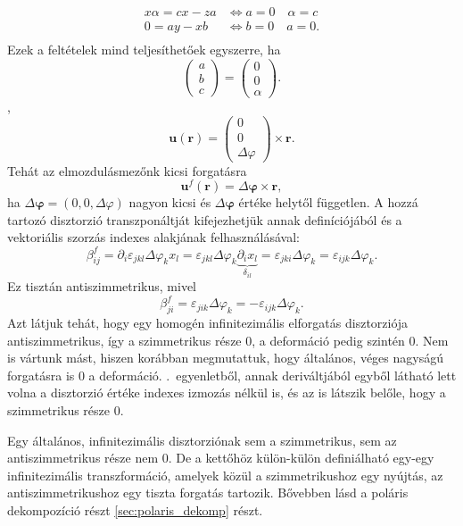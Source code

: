\documentclass[12pt,a4paper]{scrartcl}
\let\mathbf\bm
\begin{document}
{\[\begin{aligned}
  x\alpha  = cx - za &  \Leftrightarrow a = 0\quad \alpha  = c \\ 
  0 = ay - xb &  \Leftrightarrow b = 0\quad a = 0. \\ 
\end{aligned} \]
Ezek a feltételek mind teljesíthetőek egyszerre, ha 
\[\left( {\begin{array}{*{20}{c}}
  a \\ 
  b \\ 
  c 
\end{array}} \right) = \left( {\begin{array}{*{20}{c}}
  0 \\ 
  0 \\ 
  \alpha  
\end{array}} \right).\]},
\[{\mathbf{u}}\left( {\mathbf{r}} \right) = \left( {\begin{array}{*{20}{c}}
  0 \\ 
  0 \\ 
  \Delta \varphi  
\end{array}} \right) \times {\mathbf{r}}.\]
Tehát az elmozdulásmezőnk kicsi forgatásra
\begin{equation} \label{eq:inf_forgat}
{{\mathbf{u}}^f}\left( {\mathbf{r}} \right) = \Delta {\mathbf{\varphi }} \times {\mathbf{r}},
\end{equation}
ha $\Delta {\mathbf{\varphi }} = \left( {0,0,\Delta \varphi } \right)$ nagyon kicsi és $\Delta {\mathbf{\varphi }}$ értéke helytől független. A hozzá tartozó disztorzió transzponáltját kifejezhetjük annak definíciójából és a vektoriális szorzás indexes alakjának felhasználásával:
\[\beta _{ij}^f = {\partial _i}{\varepsilon _{jkl}}\Delta {\varphi _k}{x_l} = {\varepsilon _{jkl}}\Delta {\varphi _k}\underbrace {{\partial _i}{x_l}}_{{\delta _{il}}} = {\varepsilon _{jki}}\Delta {\varphi _k} = {\varepsilon _{ijk}}\Delta {\varphi _k}.\]
Ez tisztán antiszimmetrikus, mivel
\[\beta _{ji}^f = {\varepsilon _{jik}}\Delta {\varphi _k} =  - {\varepsilon _{ijk}}\Delta {\varphi _k}.\]
Azt látjuk tehát, hogy egy homogén infinitezimális elforgatás disztorziója  antiszimmetrikus, így a szimmetrikus része 0, a deformáció pedig szintén 0. Nem is vártunk mást, hiszen korábban megmutattuk, hogy általános, véges nagyságú forgatásra is 0 a deformáció. .\ egyenletből, annak deriváltjából egyből látható lett volna a disztorzió értéke indexes izmozás nélkül is, és az is látszik belőle, hogy a szimmetrikus része 0.

Egy általános, infinitezimális disztorziónak sem a szimmetrikus, sem az antiszimmetrikus része nem 0. De a kettőhöz külön-külön definiálható egy-egy infinitezimális transzformáció, amelyek közül a szimmetrikushoz egy nyújtás, az antiszimmetrikushoz egy tiszta forgatás tartozik. Bővebben lásd a poláris dekompozíció részt \ref{sec:polaris_dekomp} részt.
\end{document}
